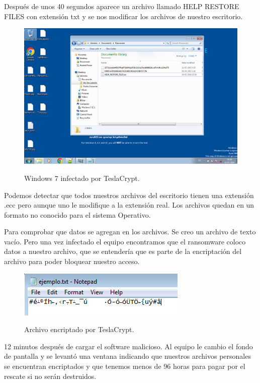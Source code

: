 \documentclass[stu, 11pt, letterpaper, donotrepeattitle, floatsintext, natbib]{apa7}
\begin{document}
Después de unos 40 segundos aparece un archivo llamado HELP RESTORE FILES con extensión txt y se nos modificar los archivos de nuestro escritorio.

\begin{figure}[H]
    \centering
    \caption{Windows 7 infectado por TeslaCrypt.}
    \includegraphics[width=0.75\linewidth]{ram8.png} %
    \label{fig:OverallEffect}
\end{figure}

Podemos detectar que todos nuestros archivos del escritorio tienen una extensión .ecc pero aunque uno le modifique a la extensión real. Los archivos quedan en un formato no conocido para el sistema Operativo.

Para comprobar que datos se agregan en los archivos. Se creo un archivo de texto vacío. Pero una vez infectado el equipo encontramos que el ransomware coloco datos a nuestro archivo, que se entendería que es parte de la encriptación del archivo para poder bloquear nuestro acceso.

\begin{figure}[H]
    \centering
    \caption{Archivo encriptado por TeslaCrypt.}
    \includegraphics[width=0.4\linewidth]{ram9.png} %
    \label{fig:OverallEffect}
\end{figure}

12 minutos después de cargar el software malicioso. Al equipo le cambio el fondo de pantalla y se levantó una ventana indicando que nuestros archivos personales se encuentran encriptados y que tenemos menos de 96 horas para pagar por el rescate si no serán destruidos.
\end{document}
